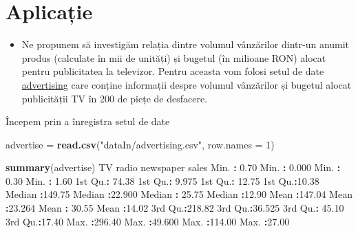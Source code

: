 \documentclass[]{article}
\newenvironment{Shaded}{\begin{snugshade}}{\end{snugshade}}
\newcommand{\KeywordTok}[1]{\textcolor[rgb]{0.13,0.29,0.53}{\textbf{#1}}}
\newcommand{\DataTypeTok}[1]{\textcolor[rgb]{0.13,0.29,0.53}{#1}}
\newcommand{\DecValTok}[1]{\textcolor[rgb]{0.00,0.00,0.81}{#1}}
\newcommand{\FloatTok}[1]{\textcolor[rgb]{0.00,0.00,0.81}{#1}}
\newcommand{\StringTok}[1]{\textcolor[rgb]{0.31,0.60,0.02}{#1}}
\newcommand{\OperatorTok}[1]{\textcolor[rgb]{0.81,0.36,0.00}{\textbf{#1}}}
\newcommand{\NormalTok}[1]{#1}
\newenvironment{frshaded*}{%
  \def\FrameCommand{\fboxrule=\FrameRule\fboxsep=\FrameSep \fcolorbox{framecolor}{shadecolor1}}%
  \MakeFramed {\advance\hsize-\width \FrameRestore}}%
{\endMakeFramed}
\newenvironment{rmdblock}[1]
  {\begin{frshaded*}
  \begin{itemize}
  \renewcommand{\labelitemi}{
    \raisebox{-.7\height}[0pt][0pt]{
      {\setkeys{Gin}{width=2em,keepaspectratio}\texttt{[image: images/icons/\#1]}}
    }
  }
  \item
  }
  {
  \end{itemize}
  \end{frshaded*}
  }
\newenvironment{rmdexercise}
  {\begin{rmdblock}{exercise}}
  {\end{rmdblock}}
\begin{document}
\section{Aplicație}\label{aplicatie}

\begin{rmdexercise}
Ne propunem să investigăm relația dintre volumul vânzărilor dintr-un
anumit produs (calculate în mii de unități) și bugetul (în milioane RON)
alocat pentru publicitatea la televizor. Pentru aceasta vom folosi setul
de date \href{dataIn/advertising.csv}{advertising} care conține
informații despre volumul vânzărilor și bugetul alocat publicității TV
în 200 de piețe de desfacere.
\end{rmdexercise}

Începem prin a înregistra setul de date

\begin{Shaded}
\begin{Highlighting}[]
\NormalTok{advertise =}\StringTok{ }\KeywordTok{read.csv}\NormalTok{(}\StringTok{"dataIn/advertising.csv"}\NormalTok{, }\DataTypeTok{row.names =} \DecValTok{1}\NormalTok{)}

\KeywordTok{summary}\NormalTok{(advertise)}
\NormalTok{       TV             radio          newspaper          sales      }
\NormalTok{ Min.   }\OperatorTok{:}\StringTok{  }\FloatTok{0.70}\NormalTok{   Min.   }\OperatorTok{:}\StringTok{ }\FloatTok{0.000}\NormalTok{   Min.   }\OperatorTok{:}\StringTok{  }\FloatTok{0.30}\NormalTok{   Min.   }\OperatorTok{:}\StringTok{ }\FloatTok{1.60}  
\NormalTok{ 1st Qu.}\OperatorTok{:}\StringTok{ }\FloatTok{74.38}\NormalTok{   1st Qu.}\OperatorTok{:}\StringTok{ }\FloatTok{9.975}\NormalTok{   1st Qu.}\OperatorTok{:}\StringTok{ }\FloatTok{12.75}\NormalTok{   1st Qu.}\OperatorTok{:}\FloatTok{10.38}  
\NormalTok{ Median }\OperatorTok{:}\FloatTok{149.75}\NormalTok{   Median }\OperatorTok{:}\FloatTok{22.900}\NormalTok{   Median }\OperatorTok{:}\StringTok{ }\FloatTok{25.75}\NormalTok{   Median }\OperatorTok{:}\FloatTok{12.90}  
\NormalTok{ Mean   }\OperatorTok{:}\FloatTok{147.04}\NormalTok{   Mean   }\OperatorTok{:}\FloatTok{23.264}\NormalTok{   Mean   }\OperatorTok{:}\StringTok{ }\FloatTok{30.55}\NormalTok{   Mean   }\OperatorTok{:}\FloatTok{14.02}  
\NormalTok{ 3rd Qu.}\OperatorTok{:}\FloatTok{218.82}\NormalTok{   3rd Qu.}\OperatorTok{:}\FloatTok{36.525}\NormalTok{   3rd Qu.}\OperatorTok{:}\StringTok{ }\FloatTok{45.10}\NormalTok{   3rd Qu.}\OperatorTok{:}\FloatTok{17.40}  
\NormalTok{ Max.   }\OperatorTok{:}\FloatTok{296.40}\NormalTok{   Max.   }\OperatorTok{:}\FloatTok{49.600}\NormalTok{   Max.   }\OperatorTok{:}\FloatTok{114.00}\NormalTok{   Max.   }\OperatorTok{:}\FloatTok{27.00}  
\end{Highlighting}
\end{Shaded}
\end{document}
